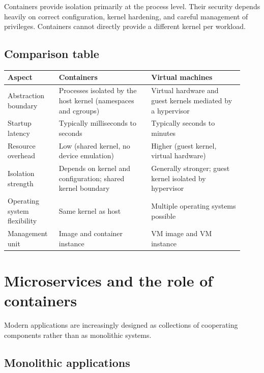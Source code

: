 \documentclass[11pt,a4paper,openany]{report}
\begin{document}
Containers provide isolation primarily at the process level. Their security depends heavily on correct configuration, kernel hardening, and careful management of privileges. Containers cannot directly provide a different kernel per workload.

\subsection{Comparison table}

\begin{center}
\small
\begin{tabular}{@{}>{\raggedright\arraybackslash}p{0.2\linewidth}>{\raggedright\arraybackslash}p{0.36\linewidth}>{\raggedright\arraybackslash}p{0.36\linewidth}@{}}
\toprule
\textbf{Aspect} & \textbf{Containers} & \textbf{Virtual machines}\\
\midrule
Abstraction boundary & Processes isolated by the host kernel (namespaces and cgroups) & Virtual hardware and guest kernels mediated by a hypervisor\\
Startup latency & Typically milliseconds to seconds & Typically seconds to minutes\\
Resource overhead & Low (shared kernel, no device emulation) & Higher (guest kernel, virtual hardware)\\
Isolation strength & Depends on kernel and configuration; shared kernel boundary & Generally stronger; guest kernel isolated by hypervisor\\
Operating system flexibility & Same kernel as host & Multiple operating systems possible\\
Management unit & Image and container instance & VM image and VM instance\\
\bottomrule
\end{tabular}
\end{center}

\section{Microservices and the role of containers}

Modern applications are increasingly designed as collections of cooperating components rather than as monolithic systems.

\subsection{Monolithic applications}
\end{document}
